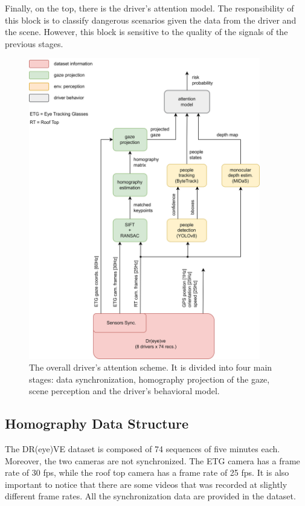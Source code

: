Finally, on the top, there is the driver's attention model. The responsibility 
of this block is to classify dangerous scenarios given the data from the 
driver and the scene. However, this block is sensitive to the quality of the 
signals of the previous stages.

\begin{figure}
    \centering
    \includegraphics[width=0.9\textwidth]{images/dreyeve/classic_scheme.png}
    \vspace*{0.6cm}
    \caption[Traditional computer vision-based driver's attention model]
    {The overall driver's attention scheme. It is divided into four main 
    stages: data synchronization, homography projection of the gaze, scene 
    perception and the driver's behavioral model.
    }
    \label{fig:driver_attention}
\end{figure}

\subsection{Homography Data Structure}
The DR(eye)VE dataset is composed of 74 sequences of five minutes each. 
Moreover, the two cameras are not synchronized. 
The ETG camera has a frame rate of 30 fps, while the roof top camera has a 
frame rate of 25 fps. It is also important to notice that there are some videos 
that was recorded at slightly different frame rates. All the synchronization data 
are provided in the dataset.

